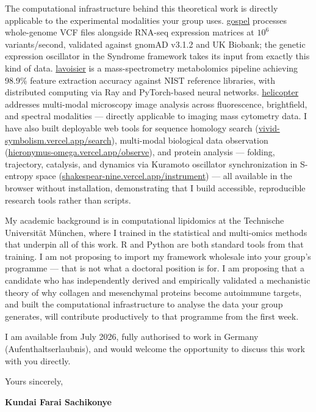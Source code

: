 \documentclass[12pt,a4paper]{article}
\begin{document}
The computational infrastructure behind this theoretical work is directly
applicable to the experimental modalities your group uses.
\href{https://github.com/fullscreen-triangle/gospel}{gospel} processes
whole-genome VCF files alongside RNA-seq expression matrices at $10^6$
variants/second, validated against gnomAD v3.1.2 and UK Biobank;
the genetic expression oscillator in the Syndrome framework takes its input
from exactly this kind of data.
\href{https://github.com/fullscreen-triangle/lavoisier}{lavoisier} is a
mass-spectrometry metabolomics pipeline achieving 98.9\% feature extraction
accuracy against NIST reference libraries, with distributed computing via Ray
and PyTorch-based neural networks.
\href{https://github.com/fullscreen-triangle/helicopter}{helicopter} addresses
multi-modal microscopy image analysis across fluorescence, brightfield, and
spectral modalities --- directly applicable to imaging mass cytometry data.
I have also built deployable web tools for sequence homology search
(\href{https://vivid-symbolism.vercel.app/search}{vivid-symbolism.vercel.app/search}),
multi-modal biological data observation
(\href{https://hieronymus-omega.vercel.app/observe}{hieronymus-omega.vercel.app/observe}),
and protein analysis --- folding, trajectory, catalysis, and dynamics via Kuramoto
oscillator synchronization in S-entropy space
(\href{https://shakespear-nine.vercel.app/instrument}{shakespear-nine.vercel.app/instrument})
--- all available in the browser without installation, demonstrating that I build
accessible, reproducible research tools rather than scripts.

My academic background is in computational lipidomics at the Technische
Universität München, where I trained in the statistical and multi-omics
methods that underpin all of this work. R and Python are both standard tools
from that training. I am not proposing to import my framework wholesale into
your group's programme --- that is not what a doctoral position is for. I
am proposing that a candidate who has independently derived and empirically
validated a mechanistic theory of why collagen and mesenchymal proteins become
autoimmune targets, and built the computational infrastructure to analyse the
data your group generates, will contribute productively to that programme from
the first week.

I am available from July 2026, fully authorised to work in Germany
(Aufenthaltserlaubnis), and would welcome the opportunity to discuss
this work with you directly.

\vspace{1.5em}
Yours sincerely,

\vspace{2.5em}
\textbf{Kundai Farai Sachikonye}
\end{document}
